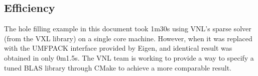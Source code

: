 \documentclass{InsightArticle}
\begin{document}
\subsection{Efficiency}
The hole filling example in this document took 1m30s using VNL's sparse solver (from the VXL library) on a single core machine. However, when it was replaced with the UMFPACK interface provided by Eigen, and identical result was obtained in only 0m1.5s. The VNL team is working to provide a way to specify a tuned BLAS library through CMake to achieve a more comparable result.


\end{document}
